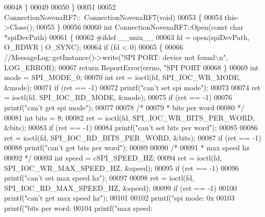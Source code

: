 \begin{DoxyCode}
00048     \}
00049 
00050 \}
00051 
00052 ConnectionNovenaRF7::~ConnectionNovenaRF7(\textcolor{keywordtype}{void})
00053 \{
00054     this->Close();
00055 \}
00056 
00060 \textcolor{keywordtype}{int} ConnectionNovenaRF7::Open(\textcolor{keyword}{const} \textcolor{keywordtype}{char} *spiDevPath)
00061 \{
00062 \textcolor{preprocessor}{#ifdef \_\_unix\_\_}
00063     fd = open(spiDevPath, O\_RDWR | O\_SYNC);
00064     \textcolor{keywordflow}{if} (fd < 0)
00065     \{
00066         \textcolor{comment}{//MessageLog::getInstance()->write("SPI PORT: device not found\(\backslash\)n", LOG\_ERROR);}
00067         \textcolor{keywordflow}{return} ReportError(errno, \textcolor{stringliteral}{"SPI PORT %
00068     \}
00069     \textcolor{keywordtype}{int} mode = SPI\_MODE\_0;
00070     \textcolor{keywordtype}{int} ret = ioctl(fd, SPI\_IOC\_WR\_MODE, &mode);
00071     \textcolor{keywordflow}{if} (ret == -1)
00072         printf(\textcolor{stringliteral}{"can't set spi mode"});
00073 
00074     ret = ioctl(fd, SPI\_IOC\_RD\_MODE, &mode);
00075     \textcolor{keywordflow}{if} (ret == -1)
00076         printf(\textcolor{stringliteral}{"can't get spi mode"});
00077 
00078     \textcolor{comment}{/*}
00079 \textcolor{comment}{     * bits per word}
00080 \textcolor{comment}{     */}
00081     \textcolor{keywordtype}{int} bits = 8;
00082     ret = ioctl(fd, SPI\_IOC\_WR\_BITS\_PER\_WORD, &bits);
00083     \textcolor{keywordflow}{if} (ret == -1)
00084         printf(\textcolor{stringliteral}{"can't set bits per word"});
00085 
00086     ret = ioctl(fd, SPI\_IOC\_RD\_BITS\_PER\_WORD, &bits);
00087     \textcolor{keywordflow}{if} (ret == -1)
00088         printf(\textcolor{stringliteral}{"can't get bits per word"});
00089 
00090     \textcolor{comment}{/*}
00091 \textcolor{comment}{     * max speed hz}
00092 \textcolor{comment}{     */}
00093     \textcolor{keywordtype}{int} speed = cSPI\_SPEED\_HZ;
00094     ret = ioctl(fd, SPI\_IOC\_WR\_MAX\_SPEED\_HZ, &speed);
00095     \textcolor{keywordflow}{if} (ret == -1)
00096         printf(\textcolor{stringliteral}{"can't set max speed hz"});
00097 
00098     ret = ioctl(fd, SPI\_IOC\_RD\_MAX\_SPEED\_HZ, &speed);
00099     \textcolor{keywordflow}{if} (ret == -1)
00100         printf(\textcolor{stringliteral}{"can't get max speed hz"});
00101 
00102     printf(\textcolor{stringliteral}{"spi mode: 0x%
00103     printf(\textcolor{stringliteral}{"bits per word: %
00104     printf(\textcolor{stringliteral}{"max speed: %
}}}}
\end{DoxyCode}
